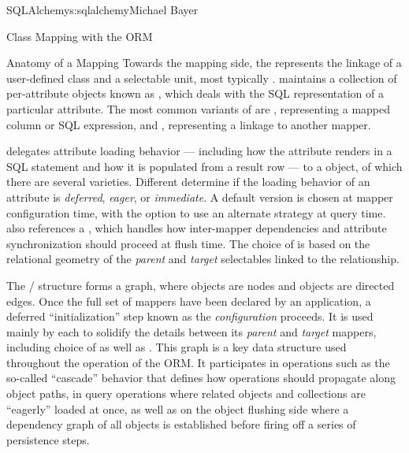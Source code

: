 \begin{aosachapter}{SQLAlchemy}{s:sqlalchemy}{Michael Bayer}
\begin{aosasect1}{Class Mapping with the ORM}
\begin{aosasect2}{Anatomy of a Mapping}
Towards the mapping side, the  represents the linkage of a user-defined class and a selectable unit,
most typically .    maintains a collection
of per-attribute objects known as , which deals with the SQL
representation of a particular attribute.  The most common variants of  are , representing
a mapped column or SQL expression, and , representing a linkage to another mapper.

 delegates attribute loading behavior --- including
how the attribute renders in a SQL statement and how it is populated from a result row ---
to a  object, of which
there are several varieties.   Different  determine if the loading behavior of
an attribute is \emph{deferred}, \emph{eager}, or \emph{immediate}.  A default version is chosen at mapper
configuration time, with the option to use an alternate strategy at query time.
 also references a ,
which handles how inter-mapper dependencies and attribute synchronization should proceed at flush time.
The choice of  is based on the relational geometry of the \emph{parent} and \emph{target}
selectables linked to the relationship.

The / structure forms a graph, where  objects are nodes and
 objects are directed edges. Once the full set of
mappers have been declared by an application, a deferred ``initialization'' step
known as the \emph{configuration} proceeds. It is used mainly by each
 to solidify the details between its \emph{parent} and
\emph{target} mappers, including choice of  as well as .
This graph is a key data structure used
throughout the operation of the ORM.  It participates in operations such as the
so-called ``cascade'' behavior that defines how operations should propagate
along object paths, in query operations where related objects and collections
are ``eagerly'' loaded at once, as well as on the object flushing side where a
dependency graph of all objects is established before firing off a series of
persistence steps.

\end{aosasect2}

\end{aosasect1}


\end{aosachapter}
